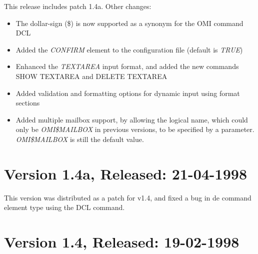 \documentclass[a4paper]{book}
\begin{document}
This release includes patch 1.4a. Other changes:
\begin{itemize}
\item The dollar-sign (\textsf{{\$}}) is now supported as a synonym for the OMI command \textsf{DCL}
\item Added the \textsl{CONFIRM} element to the configuration file (default is \textsl{TRUE})
\item Enhanced the \textsl{TEXTAREA} input format, and added the new commands \textsf{SHOW TEXTAREA} and \textsf{DELETE TEXTAREA}
\item Added validation and formatting options for dynamic input using format sections
\item Added multiple mailbox support, by allowing the logical name, which could only be \textsl{OMI{\$}MAILBOX} in previous versions, to be specified by a parameter. \textsl{OMI{\$}MAILBOX} is still the default value.
\end{itemize}

\section*{Version 1.4a, Released: 21-04-1998}
                                                                               
This version was distributed as a patch for v1.4, and fixed a bug in de command
element type using the DCL command.

\section*{Version 1.4, Released: 19-02-1998}
\end{document}
